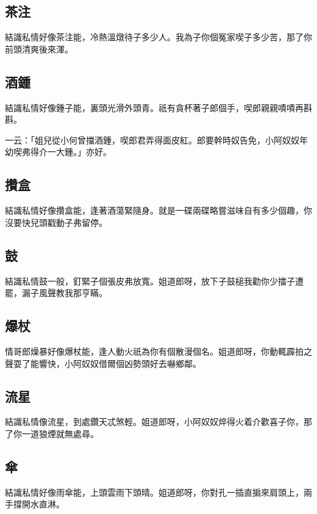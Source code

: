 \subsection*{茶注}

結識私情好像茶注能，冷熱溫燉待子多少人。我為子你個冤家喫子多少苦，那了你前頭清爽後來渾。

\subsection*{酒鍾}

結識私情好像鍾子能，裏頭光滑外頭青。祇有貪杯著子郎個手，喫郎親親嘖嘖再斟斟。

一云：「姐兒從小何曾擋酒鍾，喫郎君弄得面皮紅。郎要幹時奴告免，小阿奴奴年幼喫弗得介一大鍾。」亦好。

\subsection*{攢盒}

結識私情好像攢盒能，逢著酒蕩緊隨身。就是一碟兩碟略嘗滋味自有多少個趣，你沒要快兒頭戳動子弗留停。

\subsection*{鼓}

結識私情鼓一般，釘緊子個張皮弗放寬。姐道郎呀，放下子鼓槌我勸你少擂子遭罷，漏子風聲教我那亨瞞。

\subsection*{爆杖}

情哥郎燥暴好像爆杖能，逢人動火祇為你有個散漫個名。姐道郎呀，你動輒霹拍之聲耍了能響快，小阿奴奴借爾個凶勢頭好去嚇鄉鄰。

\subsection*{流星}

結識私情像流星，到處鑽天忒煞輕。姐道郎呀，小阿奴奴焠得火着介歡喜子你，那了你一道狼煙就無處尋。

\subsection*{傘}

結識私情好像雨傘能，上頭雲雨下頭晴。姐道郎呀，你對孔一插直掮來肩頭上，兩手撐開水直淋。

